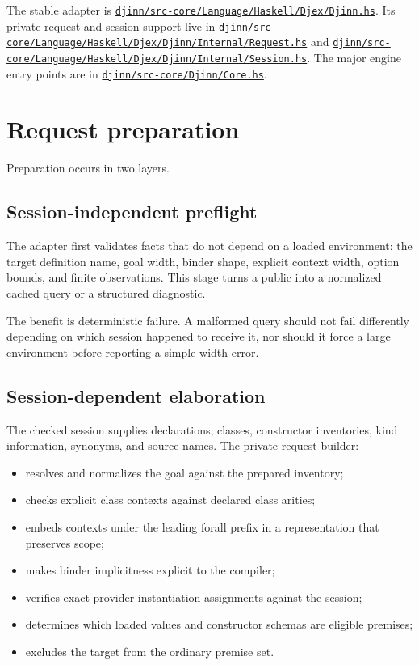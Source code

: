 \documentclass[10pt,letterpaper,oneside]{report}
\newcommand{\code}[1]{\texttt{\detokenize{#1}}}
\def\DjexBase{https://github.com/VladimirReshetnikov/Djex/blob/d3d9662598460316bdcd177ce6768c521e764aa8/}
\newcommand{\dpath}[1]{\href{\DjexBase#1}{\nolinkurl{#1}}}
\begin{document}
The stable adapter is \dpath{djinn/src-core/Language/Haskell/Djex/Djinn.hs}. Its private request and session support live in \dpath{djinn/src-core/Language/Haskell/Djex/Djinn/Internal/Request.hs} and \dpath{djinn/src-core/Language/Haskell/Djex/Djinn/Internal/Session.hs}. The major engine entry points are in \dpath{djinn/src-core/Djinn/Core.hs}.

\section{Request preparation}

Preparation occurs in two layers.

\subsection{Session-independent preflight}

The adapter first validates facts that do not depend on a loaded environment: the target definition name, goal width, binder shape, explicit context width, option bounds, and finite observations. This stage turns a public \code{QueryRequest} into a normalized cached query or a structured diagnostic.

The benefit is deterministic failure. A malformed query should not fail differently depending on which session happened to receive it, nor should it force a large environment before reporting a simple width error.

\subsection{Session-dependent elaboration}

The checked session supplies declarations, classes, constructor inventories, kind information, synonyms, and source names. The private request builder:

\begin{itemize}
  \item resolves and normalizes the goal against the prepared inventory;
  \item checks explicit class contexts against declared class arities;
  \item embeds contexts under the leading forall prefix in a representation that preserves scope;
  \item makes binder implicitness explicit to the compiler;
  \item verifies exact provider-instantiation assignments against the session;
  \item determines which loaded values and constructor schemas are eligible premises;
  \item excludes the target from the ordinary premise set.
\end{itemize}
\end{document}
